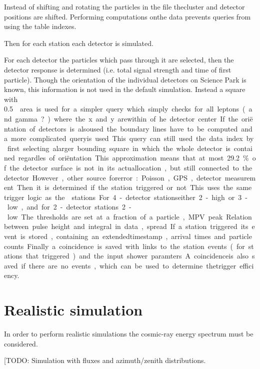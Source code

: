 Instead of shifting and rotating the particles in the \corsika file thecluster and detector positions are shifted. Performing computations onthe \corsika data prevents queries from using the table indexes.

Then for each station each detector is simulated.

For each detector the particles which pass through it are selected, then the detector response is determined (i.e. total signal strength and time of first particle). Though the orientation of the individual detectors on Science Park is known, this information is not used in the default simulation. Instead a square with \SI{.5}{\meter\square} area is used for a simpler query which simply checks for all leptons (and gamma?) where the x and y arewithin .. of he detector center. If the oriëntation of detectors is alsoused the boundary lines have to be computed and a more complicated queryis used. This query can still used the data index by first selecting alarger bounding square in which the whole detector is contained regardles of oriëntation. This approximation means that at most\SI{29.2}{\percent} of the detector surface is not in its actuallocation, but still connected to the detector. However, other source forerror: Poisson, GPS, detector measurement.

Then it is determined if the station triggered or not. This uses the same trigger logic as the \hisparc stations. For 4-detector stationseither 2-high or 3-low, and for 2-detector stations 2-low. The thresholds are set at a fraction of a particle, MPV peak.. Relation between pulse height and integral in data, spread..

If a station triggered its event is stored, containing an extendedtimestamp, arrival times and particle counts.

Finally a coincidence is saved with links to the station events (for stations that triggered) and the input shower paramters. A coincidenceis also saved if there are no events, which can be used to determine thetrigger efficiency.


\section{Realistic simulation}


In order to perform realistic simulations the cosmic-ray energy spectrum must be considered.

[TODO: Simulation with fluxes and azimuth/zenith distributions.


